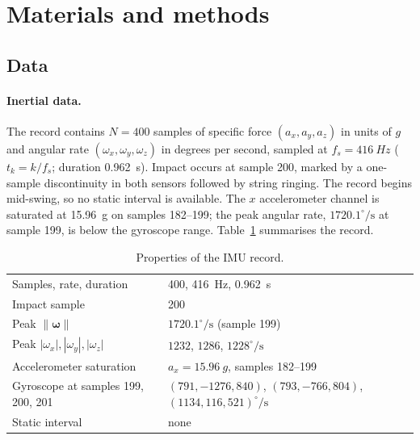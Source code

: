 \documentclass[11pt,a4paper]{article}
\newcommand{\w}{\bm{\omega}}
\newcommand{\dg}{^{\circ}}
\newcommand{\norm}[1]{\left\lVert #1 \right\rVert}
\begin{document}
\section{Materials and methods}
\subsection{Data}\label{sec:data}
\paragraph{Inertial data.} The record contains $N=400$ samples of specific force
$(a_x,a_y,a_z)$ in units of $g$ and angular rate $(\omega_x,\omega_y,\omega_z)$ in degrees per
second, sampled at $f_s=\SI{416}{Hz}$ ($t_k=k/f_s$; duration \SI{0.962}{s}). Impact occurs at
sample 200, marked by a one-sample discontinuity in both sensors followed by string ringing. The
record begins mid-swing, so no static interval is available. The $x$ accelerometer channel is
saturated at \SI{15.96}{g} on samples 182--199; the peak angular rate, $1720.1\dg/\mathrm{s}$ at
sample 199, is below the gyroscope range. Table~\ref{tab:imu} summarises the record.

\begin{table}[H]\centering\small
\caption{Properties of the IMU record.}\label{tab:imu}
\begin{tabular}{@{}ll@{}}\toprule
Samples, rate, duration & 400, \SI{416}{Hz}, \SI{0.962}{s} \\
Impact sample & 200 \\
Peak $\norm{\w}$ & $1720.1\dg/\mathrm{s}$ (sample 199) \\
Peak $|\omega_x|,|\omega_y|,|\omega_z|$ & $1232$, $1286$, $1228\dg/\mathrm{s}$ \\
Accelerometer saturation & $a_x=\SI{15.96}{g}$, samples 182--199 \\
Gyroscope at samples 199, 200, 201 & $(791,-1276,840)$, $(793,-766,804)$, $(1134,116,521)\dg/\mathrm{s}$\\
Static interval & none \\\bottomrule
\end{tabular}
\end{table}
\end{document}
